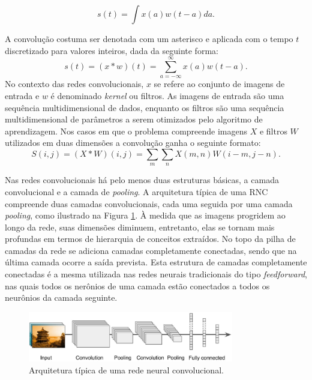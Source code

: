 \begin{equation}
 s(t) = \int{x(a) w(t-a)da}.
 \label{eq:1}
\end{equation}

A convolução costuma ser denotada com um asterisco e aplicada com o tempo $t$ discretizado para valores inteiros,
dada da seguinte forma:
\begin{equation}
 s(t) = (x * w)(t) = \sum_{a=-\infty}^{\infty}{x(a)w(t-a)}.
 \label{eq:2}
\end{equation}
No contexto das redes convolucionais, $x$ se refere ao conjunto de imagens de entrada 
e $w$ é denominado \textit{kernel} ou filtros. As imagens de entrada são uma sequência multidimensional 
de dados, enquanto os filtros são uma sequência multidimensional de parâmetros a serem 
otimizados pelo algoritmo de aprendizagem.
Nos casos em que o problema compreende imagens $X$ e filtros $W$ utilizados em duas dimensões 
a convolução ganha o seguinte formato:
\begin{equation}
 S(i,j) = (X*W)(i,j) = \sum_{m}\sum_{n}{X(m,n)W(i-m,j-n)}.
\end{equation}

Nas redes convolucionais há pelo menos duas estruturas básicas, a camada convolucional e a camada de \textit{pooling}.
A arquitetura típica de uma RNC compreende duas camadas convolucionais, cada uma seguida por
uma camada \textit{pooling}, como ilustrado na Figura \ref{fig:cnn_basic_arq}. À medida que as imagens progridem
ao longo da rede, suas dimensões diminuem, entretanto, elas se tornam mais profundas
em termos de hierarquia de conceitos extraídos. No topo da pilha de camadas da rede
se adiciona camadas completamente conectadas, sendo que na última camada ocorre a saída prevista.
Esta estrutura de camadas completamente conectadas é a mesma utilizada nas redes neurais tradicionais
do tipo \textit{feedforward}, nas quais todos os nerônios de uma camada estão conectados a todos os
neurônios da camada seguinte. 
\begin{figure}[htp]
\begin{center}
  \includegraphics[width=0.8\textwidth]{fig/cnn_basic_arq}
  \caption{Arquitetura típica de uma rede neural convolucional. \citep{aurelien17}}
  \label{fig:cnn_basic_arq}
\end{center}
\end{figure}

